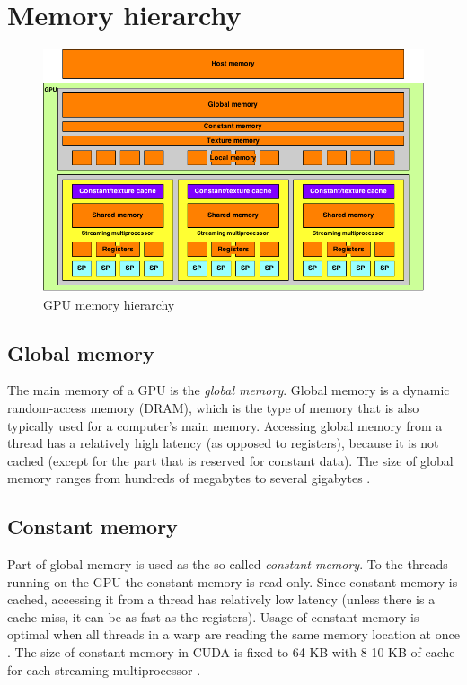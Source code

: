 \documentclass[12pt,oneside]{fithesis2}
\begin{document}
      \section{Memory hierarchy}
      \begin{figure}
        \centering
        \includegraphics[width=\linewidth]{images/gpu-memory.png}
        \caption{GPU memory hierarchy}
      \end{figure}
      
      \subsection{Global memory}
      The main memory of a GPU is the \emph{global memory}. Global memory is a dynamic random-access memory (DRAM), which is the type of memory that is also typically used for a computer's main memory. Accessing global memory from a thread has a relatively high latency (as opposed to registers), because it is not cached (except for the part that is reserved for constant data). The size of global memory ranges from hundreds  of megabytes to several gigabytes \cite{wiki:listOfGPUs}.
      
      \subsection{Constant memory}
      Part of global memory is used as the so-called \emph{constant memory}. To the threads running on the GPU the constant memory is read-only. Since constant memory is cached, accessing it from a thread has relatively low latency (unless there is a cache miss, it can be as fast as the registers). Usage of constant memory is optimal when all threads in a warp are reading the same memory location at once \cite[section 5.3.2., Constant memory]{nvidia:cudaProgGuide}. The size of constant memory in CUDA is fixed to 64 KB with 8-10 KB of cache for each streaming multiprocessor \cite[appendix G.1]{nvidia:cudaProgGuide}.
      
\end{document}
